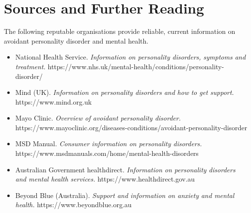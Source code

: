 \section*{Sources and Further Reading}
The following reputable organisations provide reliable, current information on avoidant personality disorder and mental health.

\begin{itemize}
    \item National Health Service. \textit{Information on personality disorders, symptoms and treatment.} https://www.nhs.uk/mental-health/conditions/personality-disorder/
    \item Mind (UK). \textit{Information on personality disorders and how to get support.} https://www.mind.org.uk
    \item Mayo Clinic. \textit{Overview of avoidant personality disorder.} https://www.mayoclinic.org/diseases-conditions/avoidant-personality-disorder
    \item MSD Manual. \textit{Consumer information on personality disorders.} https://www.msdmanuals.com/home/mental-health-disorders
    \item Australian Government healthdirect. \textit{Information on personality disorders and mental health services.} https://www.healthdirect.gov.au
    \item Beyond Blue (Australia). \textit{Support and information on anxiety and mental health.} https://www.beyondblue.org.au
\end{itemize}
